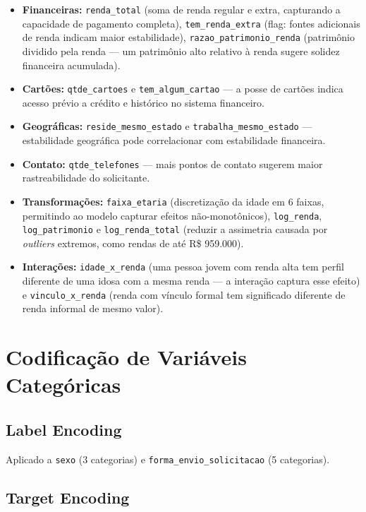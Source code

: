 \documentclass[12pt, a4paper]{article}
\newcommand{\code}[1]{\texttt{#1}}
\begin{document}
\begin{itemize}[leftmargin=2em, nosep]
  \item \textbf{Financeiras:} \code{renda\_total} (soma de renda regular e extra, capturando a capacidade de pagamento completa), \code{tem\_renda\_extra} (flag: fontes adicionais de renda indicam maior estabilidade), \code{razao\_patrimonio\_renda} (patrimônio dividido pela renda --- um patrimônio alto relativo à renda sugere solidez financeira acumulada).
  \item \textbf{Cartões:} \code{qtde\_cartoes} e \code{tem\_algum\_cartao} --- a posse de cartões indica acesso prévio a crédito e histórico no sistema financeiro.
  \item \textbf{Geográficas:} \code{reside\_mesmo\_estado} e \code{trabalha\_mesmo\_estado} --- estabilidade geográfica pode correlacionar com estabilidade financeira.
  \item \textbf{Contato:} \code{qtde\_telefones} --- mais pontos de contato sugerem maior rastreabilidade do solicitante.
  \item \textbf{Transformações:} \code{faixa\_etaria} (discretização da idade em 6 faixas, permitindo ao modelo capturar efeitos não-monotônicos), \code{log\_renda}, \code{log\_patrimonio} e \code{log\_renda\_total} (reduzir a assimetria causada por \textit{outliers} extremos, como rendas de até R\$ 959.000).
  \item \textbf{Interações:} \code{idade\_x\_renda} (uma pessoa jovem com renda alta tem perfil diferente de uma idosa com a mesma renda --- a interação captura esse efeito) e \code{vinculo\_x\_renda} (renda com vínculo formal tem significado diferente de renda informal de mesmo valor).
\end{itemize}

\section{Codificação de Variáveis Categóricas}

\subsection{Label Encoding}

Aplicado a \code{sexo} (3 categorias) e \code{forma\_envio\_solicitacao} (5 categorias).

\subsection{Target Encoding}
\end{document}
